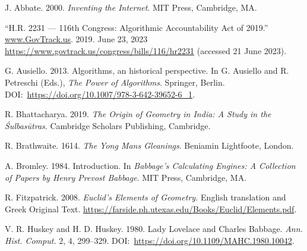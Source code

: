 {{{\begin{thebibliography}{}
 J. Abbate. 2000. \textit{Inventing the Internet}. MIT Press, Cambridge, MA.

 ``H.R. 2231 --- 116th Congress: Algorithmic Accountability Act of 2019.'' \href{https://www.GovTrack.us}{www.GovTrack.us}. 2019. June 23, 2023 \href{https://www.govtrack.us/congress/bills/116/hr2231}{https://{\allowbreak}www.{\allowbreak}govtrack.{\allowbreak}us/{\allowbreak}congress/{\allowbreak}bills/{\allowbreak}116/{\allowbreak}hr2231} (accessed 21 June 2023).

 G. Ausiello. 2013. Algorithms, an historical perspective. In G. Ausiello and R. Petreschi (Eds.), \textit{The Power of Algorithms}. Springer, Berlin. DOI:~\href{https://doi.org/10.1007/978-3-642-39652-6\_1}{https://{\allowbreak}doi.{\allowbreak}org/{\allowbreak}10.{\allowbreak}1007/{\allowbreak}978-{\allowbreak}3-{\allowbreak}642-{\allowbreak}39652-{\allowbreak}6\_1}.

 R. Bhattacharya. 2019. \textit{The Origin of Geometry in India: A Study in the \'{S}ulbas\={u}tras}. Cambridge Scholars Publishing, Cambridge.

 R. Brathwaite. 1614. \textit{The Yong Mans Gleanings}. Beniamin Lightfoote, London.

 A. Bromley. 1984. Introduction. In \textit{Babbage's Calculating Engines: A Collection of Papers by Henry Prevost Babbage}. MIT Press, Cambridge, MA.

 R. Fitzpatrick. 2008. \textit{Euclid's Elements of Geometry.} English translation and Greek Original Text. \href{https://farside.ph.utexas.edu/Books/Euclid/Elements.pdf}{https://{\allowbreak}farside.{\allowbreak}ph.{\allowbreak}utexas.{\allowbreak}edu/{\allowbreak}Books/{\allowbreak}Euclid/{\allowbreak}Elements.pdf}.

 V. R. Huskey and H. D. Huskey. 1980. Lady Lovelace and Charles Babbage. \textit{Ann. Hist. Comput.} 2, 4, 299--329. DOI:~\href{https://doi.org/10.1109/MAHC.1980.10042}{https://{\allowbreak}doi.{\allowbreak}org/{\allowbreak}10.{\allowbreak}1109/{\allowbreak}MAHC.{\allowbreak}1980.{\allowbreak}10042}.


\end{thebibliography}}}}

